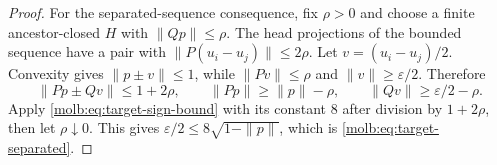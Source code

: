 \begin{proof}
For the separated-sequence consequence, fix \(\rho>0\) and choose a
finite ancestor-closed \(H\) with \(\|Qp\|\le\rho\).  The head
projections of the bounded sequence have a pair with
\(\|P(u_i-u_j)\|\le2\rho\).  Let \(v=(u_i-u_j)/2\).  Convexity
gives \(\|p\pm v\|\le1\), while
\(\|Pv\|\le\rho\) and \(\|v\|\ge\varepsilon/2\).  Therefore
\[
 \|Pp\pm Qv\|\le1+2\rho,\qquad
 \|Pp\|\ge\|p\|-\rho,\qquad
 \|Qv\|\ge\varepsilon/2-\rho.
\]
Apply \eqref{molb:eq:target-sign-bound} with its constant \(8\) after
division by \(1+2\rho\), then let \(\rho\downarrow0\).  This gives
\(\varepsilon/2\le8\sqrt{1-\|p\|}\), which is
\eqref{molb:eq:target-separated}.
\end{proof}
